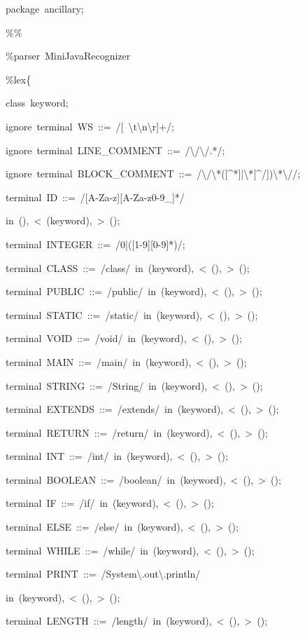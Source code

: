 \documentclass[12pt,english,twoside]{report}
\newenvironment{codeblock}
{\begin{list}{}{
\setlength{\rightmargin}{\leftmargin}
\setlength{\listparindent}{0pt}%
\raggedright
\setlength{\itemsep}{0pt}
\setlength{\parsep}{0pt}
\normalfont\ttfamily}%
 \item[]}
{\end{list}}
\begin{document}
\begin{codeblock}
package~ancillary;

\%\%

\%parser~MiniJavaRecognizer

\%lex\{
\begin{codeblock}
class~keyword;

ignore~terminal~WS~::=~/{[}~\textbackslash{}t\textbackslash{}n\textbackslash{}r]+/;

ignore~terminal~LINE\_COMMENT~::=~/\textbackslash{}/\textbackslash{}/.{*}/;

ignore~terminal~BLOCK\_COMMENT~::=~/\textbackslash{}/\textbackslash{}{*}({[}\textasciicircum{}{*}]|\textbackslash{}{*}{[}\textasciicircum{}/])\textbackslash{}{*}\textbackslash{}//;

terminal~ID~::=~/{[}A-Za-z]{[}A-Za-z0-9\_]{*}/
\begin{codeblock}
in~(),~<~(keyword),~>~();
\end{codeblock}
terminal~INTEGER~::=~/0|({[}1-9]{[}0-9]{*})/;

terminal~CLASS~::=~/class/~in~(keyword),~<~(),~>~();

terminal~PUBLIC~::=~/public/~in~(keyword),~<~(),~>~();

terminal~STATIC~::=~/static/~in~(keyword),~<~(),~>~();

terminal~VOID~::=~/void/~in~(keyword),~<~(),~>~();

terminal~MAIN~::=~/main/~in~(keyword),~<~(),~>~();

terminal~STRING~::=~/String/~in~(keyword),~<~(),~>~();

terminal~EXTENDS~::=~/extends/~in~(keyword),~<~(),~>~();

terminal~RETURN~::=~/return/~in~(keyword),~<~(),~>~();

terminal~INT~::=~/int/~in~(keyword),~<~(),~>~();

terminal~BOOLEAN~::=~/boolean/~in~(keyword),~<~(),~>~();

terminal~IF~::=~/if/~in~(keyword),~<~(),~>~();

terminal~ELSE~::=~/else/~in~(keyword),~<~(),~>~();

terminal~WHILE~::=~/while/~in~(keyword),~<~(),~>~();

terminal~PRINT~::=~/System\textbackslash{}.out\textbackslash{}.println/
\begin{codeblock}
in~(keyword),~<~(),~>~();
\end{codeblock}
terminal~LENGTH~::=~/length/~in~(keyword),~<~(),~>~();


\end{codeblock}
\end{codeblock}
\end{document}
